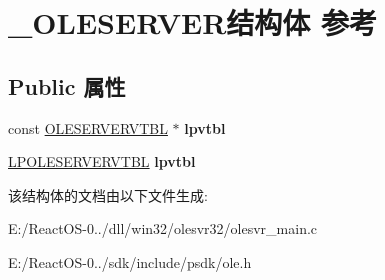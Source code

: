 \hypertarget{struct___o_l_e_s_e_r_v_e_r}{}\section{\+\_\+\+O\+L\+E\+S\+E\+R\+V\+E\+R结构体 参考}
\label{struct___o_l_e_s_e_r_v_e_r}
\subsection*{Public 属性}
\begin{DoxyCompactItemize}
\item 
\mbox{\label{struct___o_l_e_s_e_r_v_e_r_ae97c0816a2723d7cd006f83637feba4b}} 
const \hyperlink{struct___o_l_e_s_e_r_v_e_r_v_t_b_l}{O\+L\+E\+S\+E\+R\+V\+E\+R\+V\+T\+BL} $\ast$ {\bfseries lpvtbl}
\item 
\mbox{\label{struct___o_l_e_s_e_r_v_e_r_a20b52936f309fb896b0fc4e39b1996fe}} 
\hyperlink{struct___o_l_e_s_e_r_v_e_r_v_t_b_l}{L\+P\+O\+L\+E\+S\+E\+R\+V\+E\+R\+V\+T\+BL} {\bfseries lpvtbl}
\end{DoxyCompactItemize}


该结构体的文档由以下文件生成\+:\begin{DoxyCompactItemize}
\item 
E\+:/\+React\+O\+S-\/0../dll/win32/olesvr32/olesvr\+\_\+main.\+c\item 
E\+:/\+React\+O\+S-\/0../sdk/include/psdk/ole.\+h\end{DoxyCompactItemize}
